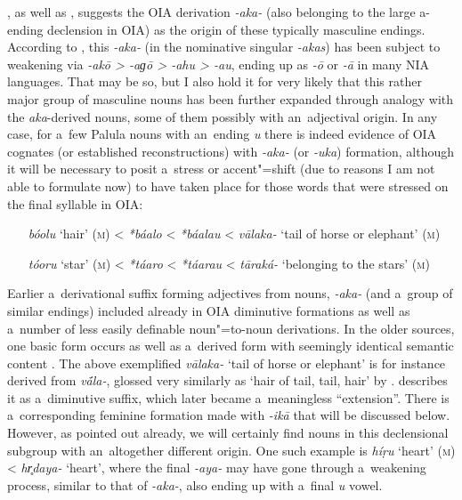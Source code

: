 \citet[15]{morgenstierne1941}, as well as \citet[29]{buddruss1967}, suggests the OIA derivation \textit{-aka-} (also belonging to the large a-ending declension in OIA) as the origin of these typically masculine endings. According to \citet[222]{masica1991}, this \textit{-aka-} (in the nominative singular \textit{-akas}) has been subject to weakening via \textit{-akō {\textgreater} -aɡō {\textgreater} -ahu {\textgreater} -au}, ending up as \textit{-ō} or \textit{-\={a}} in many NIA languages. That may be so, but I also hold it for very likely that this rather major group of masculine nouns has been further expanded through analogy with the \textit{aka}-derived nouns, some of them possibly with an~adjectival origin. In any case, for a~few Palula nouns with an~ending \textit{u} there is indeed evidence of OIA cognates (or established reconstructions) with \textit{-aka-} (or \textit{-uka}) formation, although it will be necessary to posit a~stress or accent"=shift (due to reasons I am not able to formulate now) to have taken place for those words that were stressed on the final syllable in OIA: 

\begin{itemize}[itemsep=0pt, leftmargin=]
\item[\textit{bóolu} `hair' (\textsc{m})] {\textless} \textit{*báalo} {\textless} \textit{*báalau} {\textless} \textit{vālaka-} `tail of horse or elephant' (\textsc{m})
\item[\textit{tóoru} `star' (\textsc{m})] {\textless} \textit{*táaro} {\textless} \textit{*táarau} {\textless} \textit{tāraká-} `belonging to the stars' (\textsc{m})
\end{itemize}

Earlier a~derivational suffix forming adjectives from nouns, \textit{-aka-} (and a~group of similar endings) included already in OIA diminutive formations as well as a~number of less easily definable noun"=to-noun derivations. In the older sources, one basic form occurs as well as a~derived form with seemingly identical semantic content \citep[1222]{whitney1960}. The above exemplified \textit{vālaka-} `tail of horse or elephant' is for instance derived from \textit{v\'{\={a}}la-}, glossed very similarly as `hair of tail, tail, hair' by \citet[12056]{turner1966}. \citet[222]{masica1991} describes it as a~diminutive suffix, which later became a~meaningless ``extension''. There is a~corresponding \citep[1181, 1222]{whitney1960} feminine formation made with \textit{-ikā} that will be discussed below. However, as pointed out already, we will certainly find nouns in this declensional subgroup with an~altogether different origin. One such example is \textit{híṛu} `heart' (\textsc{m}) {\textless} \textit{hr̥daya-} `heart', where the final \textit{-aya-} may have gone through a~weakening process, similar to that of \textit{-aka-}, also ending up with a~final \textit{u} vowel.


